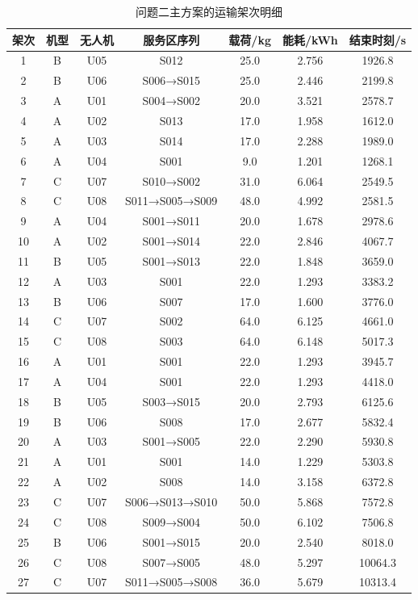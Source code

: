 \documentclass[bwprint]{gmcmthesis}
\begin{document}
\begin{appendices}
\begin{table}[H]
\centering
\caption{问题二主方案的运输架次明细}
\label{tab:appq2}
\renewcommand\arraystretch{1.15}
\begin{tabularx}{\textwidth}{|c|C|C|C|C|C|C|}
  \hline
  架次 & 机型 & 无人机 & 服务区序列 & 载荷/kg & 能耗/kWh & 结束时刻/s \\
   & B & U05 & S012 & 25.0 & 2.756 & 1926.8 \\
  2 & B & U06 & S006→S015 & 25.0 & 2.446 & 2199.8 \\
  3 & A & U01 & S004→S002 & 20.0 & 3.521 & 2578.7 \\
  4 & A & U02 & S013 & 17.0 & 1.958 & 1612.0 \\
  5 & A & U03 & S014 & 17.0 & 2.288 & 1989.0 \\
  6 & A & U04 & S001 & 9.0 & 1.201 & 1268.1 \\
  7 & C & U07 & S010→S002 & 31.0 & 6.064 & 2549.5 \\
  8 & C & U08 & S011→S005→S009 & 48.0 & 4.992 & 2581.5 \\
  9 & A & U04 & S001→S011 & 20.0 & 1.678 & 2978.6 \\
  10 & A & U02 & S001→S014 & 22.0 & 2.846 & 4067.7 \\
  11 & B & U05 & S001→S013 & 22.0 & 1.848 & 3659.0 \\
  12 & A & U03 & S001 & 22.0 & 1.293 & 3383.2 \\
  13 & B & U06 & S007 & 17.0 & 1.600 & 3776.0 \\
  14 & C & U07 & S002 & 64.0 & 6.125 & 4661.0 \\
  15 & C & U08 & S003 & 64.0 & 6.148 & 5017.3 \\
  16 & A & U01 & S001 & 22.0 & 1.293 & 3945.7 \\
  17 & A & U04 & S001 & 22.0 & 1.293 & 4418.0 \\
  18 & B & U05 & S003→S015 & 20.0 & 2.793 & 6125.6 \\
  19 & B & U06 & S008 & 17.0 & 2.677 & 5832.4 \\
  20 & A & U03 & S001→S005 & 22.0 & 2.290 & 5930.8 \\
  21 & A & U01 & S001 & 14.0 & 1.229 & 5303.8 \\
  22 & A & U02 & S008 & 14.0 & 3.158 & 6372.8 \\
  23 & C & U07 & S006→S013→S010 & 50.0 & 5.868 & 7572.8 \\
  24 & C & U08 & S009→S004 & 50.0 & 6.102 & 7506.8 \\
  25 & B & U06 & S001→S015 & 20.0 & 2.540 & 8018.0 \\
  26 & C & U08 & S007→S005 & 48.0 & 5.297 & 10064.3 \\
  27 & C & U07 & S011→S005→S008 & 36.0 & 5.679 & 10313.4 \\
  \hline
\end{tabularx}
\end{table}


\end{appendices}
\end{document}
